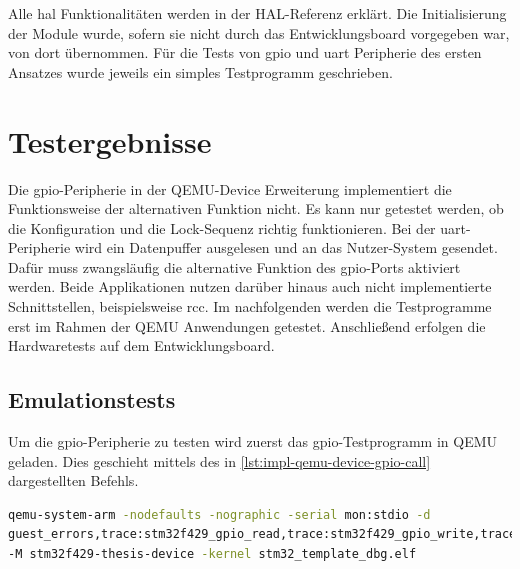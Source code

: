 Alle \ac{hal} Funktionalitäten werden in der HAL-Referenz
erklärt\cite{Stm32F4HalMan}.
Die Initialisierung der Module wurde, sofern sie nicht durch das
Entwicklungsboard vorgegeben war, von dort übernommen.
Für die Tests von \ac{gpio} und \ac{uart} Peripherie des ersten Ansatzes wurde
jeweils ein simples Testprogramm geschrieben\cite{Stm32TestsRepo}.

\section{Testergebnisse}

Die \ac{gpio}-Peripherie in der QEMU-Device Erweiterung implementiert die Funktionsweise
der alternativen Funktion nicht.
Es kann nur getestet werden, ob die Konfiguration und die Lock-Sequenz richtig
funktionieren.
\newline
Bei der \ac{uart}-Peripherie wird ein Datenpuffer ausgelesen und an das
Nutzer-System gesendet.
Dafür muss zwangsläufig die alternative Funktion des \ac{gpio}-Ports aktiviert
werden\cite{Stm32F4Trm}.
Beide Applikationen nutzen darüber hinaus auch nicht implementierte
Schnittstellen, beispielsweise \ac{rcc}.
Im nachfolgenden werden die Testprogramme erst im Rahmen der QEMU Anwendungen
getestet.
Anschließend erfolgen die Hardwaretests auf dem Entwicklungsboard.

\subsection{Emulationstests}
\label{sec:impl-tests-emulation}

Um die \ac{gpio}-Peripherie zu testen wird zuerst das \ac{gpio}-Testprogramm in
QEMU geladen.
Dies geschieht mittels des in \ref{lst:impl-qemu-device-gpio-call}
dargestellten Befehls.

\begin{minipage}{\linewidth}
\begin{lstlisting}[language=sh,numbers=none,
                label={lst:impl-qemu-device-gpio-call},
                caption=QEMU Aufruf für die Tests der GPIO Peripherie]
qemu-system-arm -nodefaults -nographic -serial mon:stdio -d
guest_errors,trace:stm32f429_gpio_read,trace:stm32f429_gpio_write,trace:stm32f429_gpio_update_lckr
-M stm32f429-thesis-device -kernel stm32_template_dbg.elf
\end{lstlisting}
\end{minipage}

